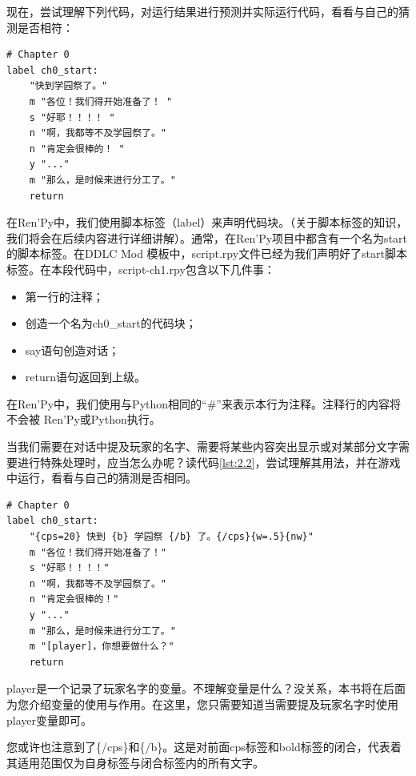 \documentclass[../../Main.tex]{subfiles}
\begin{document}
现在，尝试理解下列代码，对运行结果进行预测并实际运行代码，看看与自己的猜测是否相符：

\begin{lstlisting}[caption=scipt-ch1.rpy, label={lst:2.1}]
# Chapter 0
label ch0_start:
    "快到学园祭了。"
    m "各位！我们得开始准备了！ "
    s "好耶！！！！ "
    n "啊，我都等不及学园祭了。"
    n "肯定会很棒的！ "
    y "..."
    m "那么，是时候来进行分工了。"
    return
\end{lstlisting}

在Ren'Py中，我们使用脚本标签（label）来声明代码块。（关于脚本标签的知识，我们将会在后续内容进行详细讲解）。通常，在Ren'Py项目中都含有一个名为start的脚本标签。在DDLC Mod 模板中，script.rpy文件已经为我们声明好了start脚本标签。在本段代码中，script-ch1.rpy包含以下几件事：

\begin{itemize}
    \item 第一行的注释；
    \item 创造一个名为ch0\_start的代码块；
    \item say语句创造对话；
    \item return语句返回到上级。
\end{itemize}

\begin{Comment}
在Ren'Py中，我们使用与Python相同的“\#”来表示本行为注释。注释行的内容将不会被 Ren'Py或Python执行。
\end{Comment}

当我们需要在对话中提及玩家的名字、需要将某些内容突出显示或对某部分文字需要进行特殊处理时，应当怎么办呢？读代码\ref{lst:2.2}，尝试理解其用法，并在游戏中运行，看看与自己的猜测是否相同。

\begin{lstlisting}[caption=scipt-ch1.rpy, label={lst:2.2}]
# Chapter 0
label ch0_start:
    "{cps=20} 快到 {b} 学园祭 {/b} 了。{/cps}{w=.5}{nw}"
    m "各位！我们得开始准备了！"
    s "好耶！！！！"
    n "啊，我都等不及学园祭了。"
    n "肯定会很棒的！"
    y "..."
    m "那么，是时候来进行分工了。"
    m "[player]，你想要做什么？"
    return
\end{lstlisting}

\begin{ExtraKnowledge}
player是一个记录了玩家名字的变量。不理解变量是什么？没关系，本书将在后面为您介绍变量的使用与作用。在这里，您只需要知道当需要提及玩家名字时使用player变量即可。
\end{ExtraKnowledge}

\begin{ExtraKnowledge}
您或许也注意到了\{/cps\}和\{/b\}。这是对前面cps标签和bold标签的闭合，代表着其适用范围仅为自身标签与闭合标签内的所有文字。
\end{ExtraKnowledge}
\end{document}
